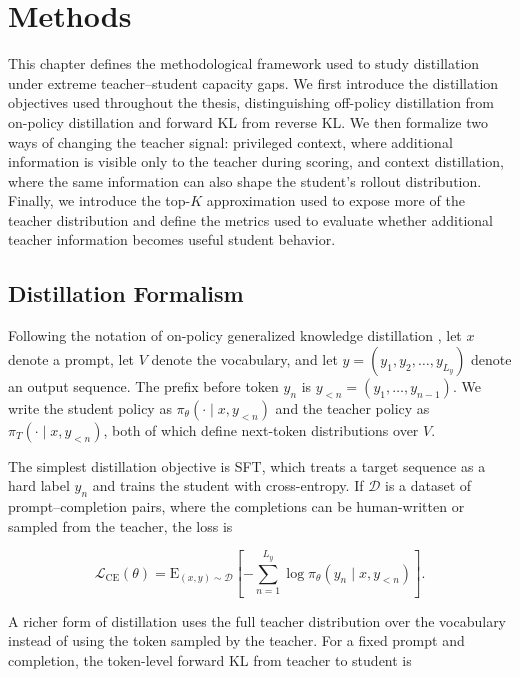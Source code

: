 \chapter{Methods}

This chapter defines the methodological framework used to study distillation under extreme teacher--student capacity gaps. We first introduce the distillation objectives used throughout the thesis, distinguishing off-policy distillation from on-policy distillation and forward KL from reverse KL. We then formalize two ways of changing the teacher signal: privileged context, where additional information is visible only to the teacher during scoring, and context distillation, where the same information can also shape the student's rollout distribution. Finally, we introduce the top-$K$ approximation used to expose more of the teacher distribution and define the metrics used to evaluate whether additional teacher information becomes useful student behavior.

\section{Distillation Formalism} \label{sec:distillation_formalism}

Following the notation of on-policy generalized knowledge distillation \citep{agarwalOnPolicyDistillationLanguage2024}, let $x$ denote a prompt, let $V$ denote the vocabulary, and let $y = (y_1, y_2, \ldots, y_{L_y})$ denote an output sequence. The prefix before token $y_n$ is $y_{<n} = (y_1, \ldots, y_{n-1})$. We write the student policy as $\pi_\theta(\cdot \mid x, y_{<n})$ and the teacher policy as $\pi_T(\cdot \mid x, y_{<n})$, both of which define next-token distributions over $V$.

The simplest distillation objective is SFT, which treats a target sequence as a hard label $y_n$ and trains the student with cross-entropy. If $\mathcal{D}$ is a dataset of prompt--completion pairs, where the completions can be human-written or sampled from the teacher, the loss is

\begin{equation}
\mathcal{L}_{\mathrm{CE}}(\theta)
= \mathrm{E}_{(x,y) \sim \mathcal{D}}
\left[
- \sum_{n=1}^{L_y}
\log \pi_\theta(y_n \mid x, y_{<n})
\right].
\label{eq:xentropy}
\end{equation}

A richer form of distillation uses the full teacher distribution over the vocabulary instead of using the token sampled by the teacher. For a fixed prompt and completion, the token-level forward KL from teacher to student is

